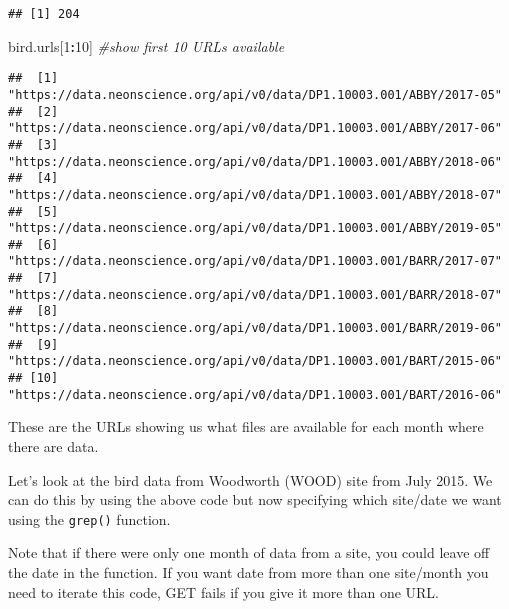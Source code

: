 \documentclass[]{book}
\newenvironment{Shaded}{\begin{snugshade}}{\end{snugshade}}
\newcommand{\CommentTok}[1]{\textcolor[rgb]{0.56,0.35,0.01}{\textit{#1}}}
\newcommand{\DataTypeTok}[1]{\textcolor[rgb]{0.13,0.29,0.53}{#1}}
\newcommand{\DecValTok}[1]{\textcolor[rgb]{0.00,0.00,0.81}{#1}}
\newcommand{\KeywordTok}[1]{\textcolor[rgb]{0.13,0.29,0.53}{\textbf{#1}}}
\newcommand{\NormalTok}[1]{#1}
\newcommand{\OperatorTok}[1]{\textcolor[rgb]{0.81,0.36,0.00}{\textbf{#1}}}
\newcommand{\StringTok}[1]{\textcolor[rgb]{0.31,0.60,0.02}{#1}}
\begin{document}
\begin{verbatim}
## [1] 204
\end{verbatim}

\begin{Shaded}
\begin{Highlighting}[]
\NormalTok{bird.urls[}\DecValTok{1}\OperatorTok{:}\DecValTok{10}\NormalTok{] }\CommentTok{#show first 10 URLs available}
\end{Highlighting}
\end{Shaded}

\begin{verbatim}
##  [1] "https://data.neonscience.org/api/v0/data/DP1.10003.001/ABBY/2017-05"
##  [2] "https://data.neonscience.org/api/v0/data/DP1.10003.001/ABBY/2017-06"
##  [3] "https://data.neonscience.org/api/v0/data/DP1.10003.001/ABBY/2018-06"
##  [4] "https://data.neonscience.org/api/v0/data/DP1.10003.001/ABBY/2018-07"
##  [5] "https://data.neonscience.org/api/v0/data/DP1.10003.001/ABBY/2019-05"
##  [6] "https://data.neonscience.org/api/v0/data/DP1.10003.001/BARR/2017-07"
##  [7] "https://data.neonscience.org/api/v0/data/DP1.10003.001/BARR/2018-07"
##  [8] "https://data.neonscience.org/api/v0/data/DP1.10003.001/BARR/2019-06"
##  [9] "https://data.neonscience.org/api/v0/data/DP1.10003.001/BART/2015-06"
## [10] "https://data.neonscience.org/api/v0/data/DP1.10003.001/BART/2016-06"
\end{verbatim}

These are the URLs showing us what files are available for each month where
there are data.

Let's look at the bird data from Woodworth (WOOD) site from July 2015. We can do
this by using the above code but now specifying which site/date we want using
the \texttt{grep()} function.

Note that if there were only one month of data from a site, you could leave
off the date in the function. If you want date from more than one site/month
you need to iterate this code, GET fails if you give it more than one URL.

\begin{Shaded}
\end{Shaded}
\end{document}
